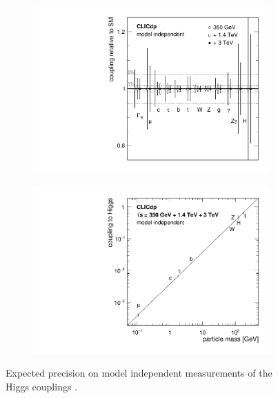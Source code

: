 \begin{figure}
  \centering
  \begin{subfigure}{.49\textwidth}
    \centering
    \includegraphics[width=0.95\linewidth]{Theory/fig/FitResultsMI.pdf}
  \end{subfigure}
    \begin{subfigure}{.49\textwidth}
    \centering
    \includegraphics[width=0.95\linewidth]{Theory/fig/CouplingvsMassMI.pdf}
  \end{subfigure}
    \caption[Expected precision on model independent measurements of the Higgs couplings]{Expected precision on model independent measurements of the Higgs couplings \cite{Abramowicz:2016zbo}.}
  \label{fig:modelIndependentCouplings}
\end{figure}

